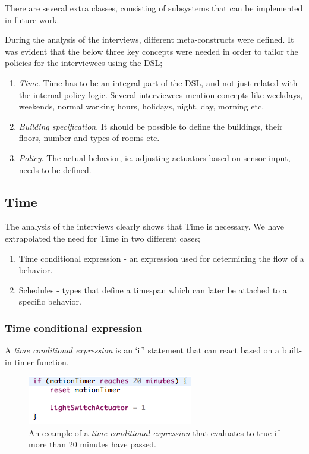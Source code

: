 \documentclass{llncs}
\begin{document}
\pagebreak
There are several extra classes, consisting of subsystems that can be implemented in future work.

During the analysis of the interviews, different meta-constructs were defined. It was evident that the below three key concepts were needed in order to tailor the policies for the interviewees using the DSL;

\begin{enumerate}
	\item \textit{Time}. Time has to be an integral part of the DSL, and not just related with the internal policy logic. Several interviewees mention concepts like weekdays, weekends, normal working hours, holidays, night, day, morning etc.
	
	\item \textit{Building specification}. It should be possible to define the buildings, their floors, number and types of rooms etc.

	\item \textit{Policy}. The actual behavior, ie. adjusting actuators based on sensor input, needs to be defined. 
\end{enumerate}

\subsection{Time}\label{subsec:time}
The analysis of the interviews clearly shows that Time is necessary. We have extrapolated the need for Time in two different cases;
	\begin{enumerate}
		\item Time conditional expression - an expression used for determining the flow of a behavior.
		\item Schedules - types that define a timespan which can later be attached to a specific behavior.
	\end{enumerate}

\subsubsection{Time conditional expression}\label{subsubsec:conditionalexpression}
A \textit{time conditional expression} is an `if' statement that can react based on a built-in timer function. 

\begin{figure}
  \centering
    \includegraphics[scale=.5]{dsl-conditional-time-expression.png} 
	\caption{An example of a \textit{time conditional expression} that evaluates to true if more than 20 minutes have passed.}
	\label{fig:dsl-conditionalexpression}
\end{figure}
\end{document}
